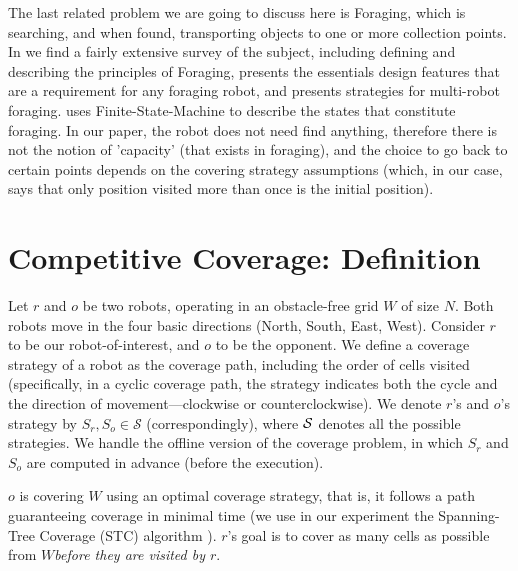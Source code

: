 \documentclass[a4paper,english,10pt]{article}
\newcommand\rob{\ensuremath{r}\xspace}
\newcommand\opp{\ensuremath{o}\xspace}
\newcommand{\w}{\ensuremath{W}\xspace}
\begin{document}
The last related problem we are going to discuss here is Foraging, which is searching, and when found, transporting objects to one or more collection points. In \cite{winfield2009foraging} we find a fairly extensive survey of the subject, including defining and describing the principles of Foraging, presents the essentials design features that are a requirement for any foraging robot, and presents strategies for multi-robot foraging. \cite{winfield2009foraging} uses Finite-State-Machine to describe the states that constitute foraging. In our paper, the robot does not need find anything, therefore there is not the notion of 'capacity' (that exists in foraging), and the choice to go back to certain points depends on the covering strategy assumptions (which, in our case, says that only position visited more than once is the initial position).


\section{Competitive Coverage: Definition}
Let \rob and \opp be two robots, operating in an obstacle-free grid \w of size $N$. Both robots move in the four basic directions (North, South, East, West). Consider \rob to be our robot-of-interest, and \opp to be the opponent. 
We define a coverage strategy of a robot as the coverage path, including the order of cells visited (specifically, in a cyclic coverage path, the strategy indicates both the cycle and the direction of movement---clockwise or counterclockwise). We denote \rob's and \opp's strategy by $S_\rob,S_\opp\in \mathcal{S}$ (correspondingly), where $\cal{S}$ denotes all the possible strategies. We handle the offline version of the coverage problem, in which $S_\rob$ and $S_\opp$ are computed in advance (before the execution). 

\opp is covering \w using an optimal coverage strategy, that is, it follows a path guaranteeing coverage in minimal time (we use in our experiment the Spanning-Tree Coverage (STC) algorithm \cite{gabriely2001spanning}). \rob's goal is to cover as many cells as possible from \w {\em before they are visited by \rob}. 
\end{document}
